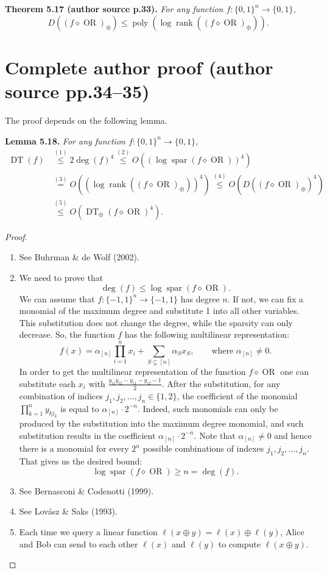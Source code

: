 \documentclass[10pt,a4paper]{article}
\newcommand{\bits}{\{0,1\}}
\newcommand{\DT}{\operatorname{DT}}
\newcommand{\comp}{\diamond}
\newcommand{\OR}{\operatorname{OR}}
\newenvironment{originalresult}[1]{\par\medskip\noindent\textbf{#1.}\itshape}{\par\medskip}
\begin{document}
\begin{originalresult}{Theorem 5.17 (author source p.33)}
For any function $f:\bits^n\to\bits$,
\[D((f\comp\OR)_\oplus)\le\operatorname{poly}(\log\operatorname{rank}((f\comp\OR)_\oplus)).\]
\end{originalresult}

\section*{Complete author proof (author source pp.34--35)}
The proof depends on the following lemma.
\begin{originalresult}{Lemma 5.18}
For any function $f:\bits^n\to\bits$,
\begin{align*}
\DT(f)&\overset{(1)}\le2\deg(f)^4\overset{(2)}\le O((\log\operatorname{spar}(f\comp\OR))^4)\\
&\overset{(3)}=O((\log\operatorname{rank}((f\comp\OR)_\oplus))^4)\overset{(4)}\le O(D((f\comp\OR)_\oplus)^4)\\
&\overset{(5)}\le O(\DT_\oplus(f\comp\OR)^4).
\end{align*}
\end{originalresult}
\begin{proof}
\begin{enumerate}
\item[(1)] See Buhrman \& de Wolf (2002).
\item[(2)] We need to prove that
\[\deg(f)\le\log\operatorname{spar}(f\comp\OR).\]
We can assume that $f:\{-1,1\}^n\to\{-1,1\}$ has degree $n$. If not, we can fix a monomial of the maximum degree and substitute 1 into all other variables. This substitution does not change the degree, while the sparsity can only decrease. So, the function $f$ has the following multilinear representation:
\[f(x)=\alpha_{[n]}\prod_{i=1}^n x_i+\sum_{S\subsetneq[n]}\alpha_Sx_S,\qquad\text{where }\alpha_{[n]}\ne0.\]
In order to get the multilinear representation of the function $f\comp\OR$ one can substitute each $x_i$ with $\frac{y_{i1}y_{i2}-y_{i1}-y_{i2}-1}{2}$. After the substitution, for any combination of indices $j_1,j_2,\ldots,j_n\in\{1,2\}$, the coefficient of the monomial $\prod_{k=1}^n y_{kj_k}$ is equal to $\alpha_{[n]}\cdot2^{-n}$. Indeed, such monomials can only be produced by the substitution into the maximum degree monomial, and such substitution results in the coefficient $\alpha_{[n]}\cdot2^{-n}$.
Note that $\alpha_{[n]}\ne0$ and hence there is a monomial for every $2^n$ possible combinations of indexes $j_1,j_2,\ldots,j_n$. That gives us the desired bound:
\[\log\operatorname{spar}(f\comp\OR)\ge n=\deg(f).\]
\item[(3)] See Bernasconi \& Codenotti (1999).
\item[(4)] See Lov\'asz \& Saks (1993).
\item[(5)] Each time we query a linear function $\ell(x\oplus y)=\ell(x)\oplus\ell(y)$, Alice and Bob can send to each other $\ell(x)$ and $\ell(y)$ to compute $\ell(x\oplus y)$.
\end{enumerate}
\end{proof}
\end{document}
